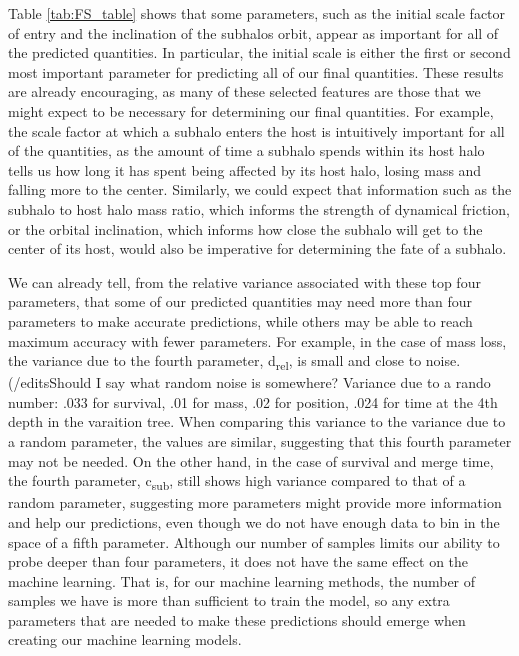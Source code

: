 \documentclass[fleqn,usenatbib]{mnras}
\begin{document}
Table \ref{tab:FS_table} shows that some parameters, such as the initial scale factor of entry and the inclination of the subhalos orbit, appear as important for all of the predicted quantities. In particular, the initial scale is either the first or second most important parameter for predicting all of our final quantities. These results are already encouraging, as many of these selected features are those that we might expect to be necessary for determining our final quantities. For example, the scale factor at which a subhalo enters the host is intuitively important for all of the quantities, as the amount of time a subhalo spends within its host halo tells us how long it has spent being affected by its host halo, losing mass and falling more to the center. Similarly, we could expect that information such as the subhalo to host halo mass ratio, which informs the strength of dynamical friction, or the orbital inclination, which informs how close the subhalo will get to the center of its host, would also be imperative for determining the fate of a subhalo.

We can already tell, from the relative variance associated with these top four parameters, that some of our predicted quantities may need more than four parameters to make accurate predictions, while others may be able to reach maximum accuracy with fewer parameters. For example, in the case of mass loss, the variance due to the fourth parameter, d\textsubscript{rel}, is small and close to noise. (/edits{Should I say what random noise is somewhere? Variance due to a rando number: .033 for survival, .01 for mass, .02 for position, .024 for time at the 4th depth in the varaition tree.} When comparing this variance to the variance due to a random parameter, the values are similar, suggesting that this fourth parameter may not be needed. On the other hand, in the case of survival and merge time, the fourth parameter, c\textsubscript{sub}, still shows high variance compared to that of a random parameter, suggesting more parameters might provide more information and help our predictions, even though we do not have enough data to bin in the space of a fifth parameter. Although our number of samples limits our ability to probe deeper than four parameters, it does not have the same effect on the machine learning. That is, for our machine learning methods, the number of samples we have is more than sufficient to train the model, so any extra parameters that are needed to make these predictions should emerge when creating our machine learning models. 
\end{document}
